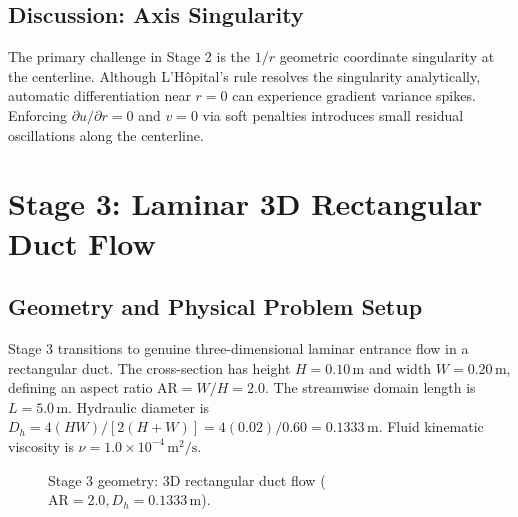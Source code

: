 \documentclass[11pt,a4paper]{article}
\begin{document}
\subsection{Discussion: Axis Singularity}
The primary challenge in Stage 2 is the $1/r$ geometric coordinate singularity at the centerline. Although L'H\^opital's rule resolves the singularity analytically, automatic differentiation near $r=0$ can experience gradient variance spikes. Enforcing $\partial u/\partial r = 0$ and $v=0$ via soft penalties introduces small residual oscillations along the centerline.

\section{Stage 3: Laminar 3D Rectangular Duct Flow}
\label{sec:stage3}

\subsection{Geometry and Physical Problem Setup}
Stage 3 transitions to genuine three-dimensional laminar entrance flow in a rectangular duct. The cross-section has height $H = 0.10\,\text{m}$ and width $W = 0.20\,\text{m}$, defining an aspect ratio $\mathrm{AR} = W/H = 2.0$. The streamwise domain length is $L = 5.0\,\text{m}$. Hydraulic diameter is $D_h = 4(H W) / [2(H+W)] = 4(0.02) / 0.60 = 0.1333\,\text{m}$. Fluid kinematic viscosity is $\nu = 1.0\times 10^{-4}\,\text{m}^2/\text{s}$.

\begin{figure}[H]
\centering
{}
\caption{Stage 3 geometry: 3D rectangular duct flow ($\mathrm{AR}=2.0, D_h=0.1333\,\text{m}$).}
\label{fig:stage3_geom}
\end{figure}
\end{document}
